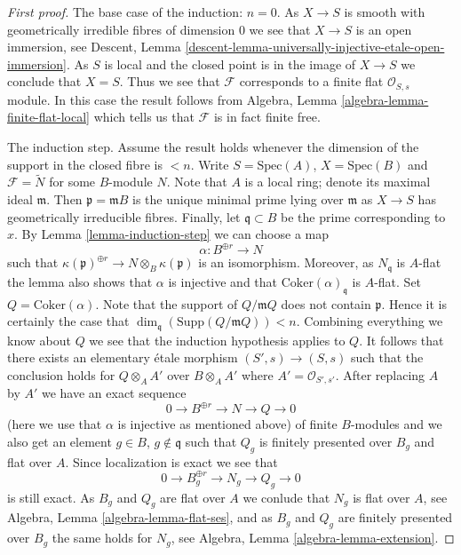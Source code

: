 \begin{proof}[First proof]
\medskip\noindent
The base case of the induction: $n = 0$.
As $X \to S$ is smooth with geometrically
irredible fibres of dimension $0$ we see that $X \to S$ is an open
immersion, see
Descent, Lemma \ref{descent-lemma-universally-injective-etale-open-immersion}.
As $S$ is local and the closed point is in the image of $X \to S$
we conclude that $X = S$. Thus we see that $\mathcal{F}$ corresponds
to a finite flat $\mathcal{O}_{S, s}$ module. In this case the result
follows from
Algebra, Lemma \ref{algebra-lemma-finite-flat-local}
which tells us that $\mathcal{F}$ is in fact finite free.

\medskip\noindent
The induction step. Assume the result holds whenever the dimension
of the support in the closed fibre is $< n$. Write $S = \text{Spec}(A)$,
$X = \text{Spec}(B)$ and $\mathcal{F} = \widetilde{N}$ for some $B$-module
$N$. Note that $A$ is a local ring; denote its maximal ideal $\mathfrak m$.
Then $\mathfrak p = \mathfrak mB$ is the unique minimal prime lying over
$\mathfrak m$ as $X \to S$ has geometrically irreducible fibres. Finally,
let $\mathfrak q \subset B$ be the prime corresponding to $x$. By
Lemma \ref{lemma-induction-step}
we can choose a map
$$
\alpha : B^{\oplus r} \to N
$$
such that $\kappa(\mathfrak p)^{\oplus r} \to N \otimes_B \kappa(\mathfrak p)$
is an isomorphism. Moreover, as $N_{\mathfrak q}$ is $A$-flat the lemma
also shows that $\alpha$ is injective and that
$\text{Coker}(\alpha)_{\mathfrak q}$ is $A$-flat.
Set $Q = \text{Coker}(\alpha)$. Note that the support of $Q/\mathfrak mQ$
does not contain $\mathfrak p$. Hence it is certainly the case that
$\dim_{\mathfrak q}(\text{Supp}(Q/\mathfrak mQ)) < n$.
Combining everything we know about $Q$ we see
that the induction hypothesis applies to $Q$. It follows that there exists
an elementary \'etale morphism $(S', s) \to (S, s)$ such that the conclusion
holds for $Q \otimes_A A'$ over $B \otimes_A A'$ where
$A' = \mathcal{O}_{S', s'}$. After replacing $A$ by $A'$ we have an
exact sequence
$$
0 \to B^{\oplus r} \to N \to Q \to 0
$$
(here we use that $\alpha$ is injective as mentioned above)
of finite $B$-modules and we also get an element
$g \in B$, $g \not \in \mathfrak q$ such that
$Q_g$ is finitely presented over $B_g$ and flat over $A$. Since localization
is exact we see that
$$
0 \to B_g^{\oplus r} \to N_g \to Q_g \to 0
$$
is still exact. As $B_g$ and $Q_g$ are flat over $A$ we conlude that
$N_g$ is flat over $A$, see
Algebra, Lemma \ref{algebra-lemma-flat-ses},
and as $B_g$ and $Q_g$ are finitely presented over $B_g$ the same holds
for $N_g$, see
Algebra, Lemma \ref{algebra-lemma-extension}.
\end{proof}

